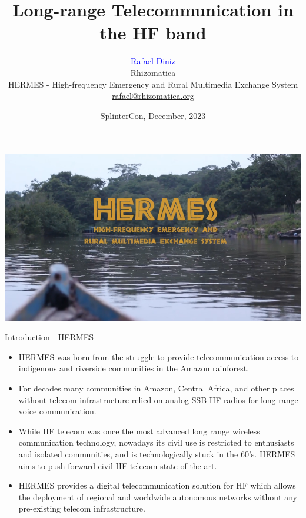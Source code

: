 \documentclass[aspectratio=169,xcolor={x11names,svgnames,dvipsnames}]{beamer}
\author[Rafael Diniz]{\texorpdfstring{\textcolor{blue}{Rafael Diniz} \\
{Rhizomatica} \\
{HERMES - High-frequency Emergency and Rural Multimedia Exchange System}\\
\url{rafael@rhizomatica.org}}{Rafael Diniz}}
\title{Long-range Telecommunication in the HF band}
\subtitle{
\texorpdfstring{ %
\hrulefill\ \adforn{57}\thickspace\wb{.}\thickspace\adforn{29}\ \hrulefill}
}
\date[7-Dec-2023]{SplinterCon, December, 2023}
\begin{document}
\begin{frame}[plain]
\maketitle
\end{frame}


\begin{frame}
\begin{center}
  \includegraphics[width=.9\columnwidth]{hermes.png}
\end{center}
\end{frame}


\begin{frame}{Introduction - HERMES}

  \begin{itemize}
  \item HERMES was born from the struggle to provide
  telecommunication access to indigenous and riverside
  communities in the Amazon rainforest.

  \item For decades many communities in Amazon, Central Africa, and other
  places without telecom infrastructure relied on analog SSB HF radios
  for long range voice communication.

  \item While HF telecom was once the most advanced long range
  wireless communication technology, nowadays its civil use is
  restricted to enthusiasts and isolated communities, and is
  technologically stuck in the 60's. HERMES aims to push forward
  civil HF telecom state-of-the-art.

  \item HERMES provides a digital telecommunication solution for HF
  which allows the deployment of regional and worldwide autonomous
  networks without any pre-existing telecom infrastructure.

  \end{itemize}

\end{frame}
\end{document}
